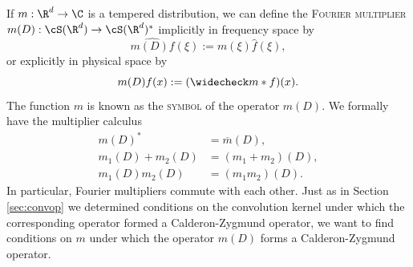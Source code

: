 \documentclass[reqno]{amsart}
\theoremstyle{definition}
\theoremstyle{remark}
\renewcommand{\emph}{\textsc}
\begin{document}
If $m :\R^d \to \C$ is a tempered distribution, we can define the \emph{Fourier multiplier} $m(D) : \cS (\R^d) \to \cS (\R^d)^*$ implicitly in frequency space by
	\[ \widehat{m(D) f} (\xi) := m(\xi) \widehat f(\xi), \]
or explicitly in physical space by
	\[ m(D) f(x) := (\widecheck m * f) (x). \]
The function $m$ is known as the \emph{symbol} of the operator $m(D)$. We formally have the multiplier calculus
	\begin{align*}
		m(D)^*
			&= \overline m(D), \\
		m_1 (D) + m_2 (D)
			&= (m_1 + m_2)(D), \\
		m_1 (D) m_2 (D)
			&= (m_1 m_2) (D).		
	\end{align*}
In particular, Fourier multipliers commute with each other. Just as in Section \ref{sec:convop} we determined conditions on the convolution kernel under which the corresponding operator formed a Calderon-Zygmund operator, we want to find conditions on $m$ under which the operator $m(D)$ forms a Calderon-Zygmund operator. 
\end{document}
